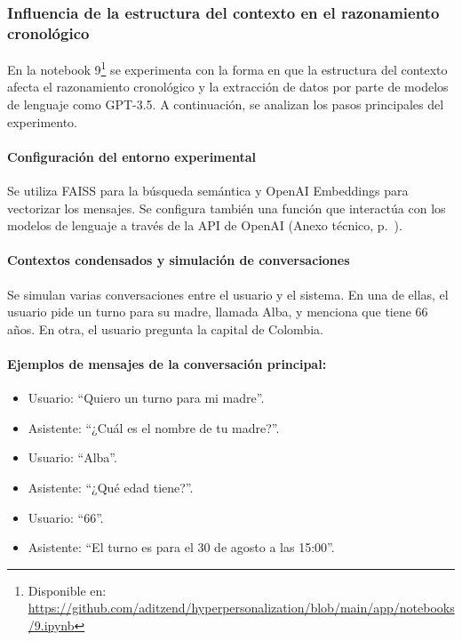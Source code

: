 \subsubsection{Influencia de la estructura del contexto en el razonamiento cronológico}

En la notebook 9\footnote{Disponible en: \url{https://github.com/aditzend/hyperpersonalization/blob/main/app/notebooks/9.ipynb}} se experimenta con la forma en que la estructura del contexto afecta el razonamiento cronológico y la extracción de datos por parte de modelos de lenguaje como GPT-3.5. A continuación, se analizan los pasos principales del experimento.

\paragraph{Configuración del entorno experimental}

Se utiliza FAISS para la búsqueda semántica y OpenAI Embeddings para vectorizar los mensajes. Se configura también una función que interactúa con los modelos de lenguaje a través de la API de OpenAI (Anexo técnico, p.~\pageref{anexo:code-4-1-9-1}).

\paragraph{Contextos condensados y simulación de conversaciones}

Se simulan varias conversaciones entre el usuario y el sistema. En una de ellas, el usuario pide un turno para su madre, llamada Alba, y menciona que tiene 66 años. En otra, el usuario pregunta la capital de Colombia.

\paragraph{Ejemplos de mensajes de la conversación principal:}
\begin{itemize}
    \item Usuario: ``Quiero un turno para mi madre''.
    \item Asistente: ``¿Cuál es el nombre de tu madre?''.
    \item Usuario: ``Alba''.
    \item Asistente: ``¿Qué edad tiene?''.
    \item Usuario: ``66''.
    \item Asistente: ``El turno es para el 30 de agosto a las 15:00''.
\end{itemize}


